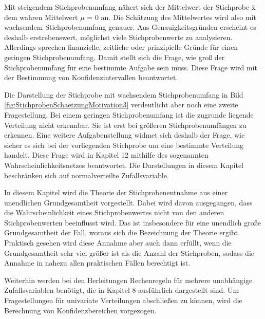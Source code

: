 \noindent Mit steigendem Stichprobenumfang n\"{a}hert sich der Mittelwert der Stichprobe $\overline{\mathrm{x}}$ dem wahren Mittelwert $\mu$ = 0 an. Die Sch\"{a}tzung des Mittelwertes wird also mit wachsendem Stichprobenumfang genauer. Aus Genauigkeitsgr\"{u}nden erscheint es deshalb erstrebenswert, m\"{o}glichst viele Stichprobenwerte zu analysieren. Allerdings sprechen finanzielle, zeitliche oder prinzipielle Gr\"{u}nde f\"{u}r einen geringen Stichprobenumfang. Damit stellt sich die Frage, wie gro{\ss} der Stichprobenumfang f\"{u}r eine bestimmte Aufgabe sein muss. Diese Frage wird mit der Bestimmung von Konfidenzintervallen beantwortet.\newline

\noindent Die Darstellung der Stichprobe mit wachsendem Stichprobenumfang in Bild \ref{fig:StichprobenSchaetzungMotivation3} verdeutlicht aber noch eine zweite Fragestellung. Bei einem geringen Stichprobenumfang ist die zugrunde liegende Verteilung nicht erkennbar. Sie ist erst bei gr\"{o}{\ss}eren Stichprobenumf\"{a}ngen zu erkennen. Eine weitere Aufgabenstellung widmet sich deshalb der Frage, wie sicher es sich bei der vorliegenden Stichprobe um eine bestimmte Verteilung handelt. Diese Frage wird in Kapitel 12 mithilfe des sogenannten Wahrscheinlichkeitsnetzes beantwortet. Die Darstellungen in diesem Kapitel beschr\"{a}nken sich auf normalverteilte Zufallsvariable.\newline

\noindent In diesem Kapitel wird die Theorie der Stichprobenentnahme aus einer unendlichen Grundgesamtheit vorgestellt. Dabei wird davon ausgegangen, dass die Wahrscheinlichkeit eines Stichprobenwertes nicht von den anderen Stichprobenwerten beeinflusst wird. Das ist insbesondere f\"{u}r eine unendlich gro{\ss}e Grundgesamtheit der Fall, woraus sich die Bezeichnung der Theorie ergibt. Praktisch gesehen wird diese Annahme aber auch dann erf\"{u}llt, wenn die Grundgesamtheit sehr viel gr\"{o}{\ss}er ist als die Anzahl der Stichproben, sodass die Annahme in nahezu allen praktischen F\"{a}llen berechtigt ist. \newline

\noindent Weiterhin werden bei den Herleitungen Rechenregeln f\"{u}r mehrere unabh\"{a}ngige Zufallsvariablen ben\"{o}tigt, die in Kapitel 8 ausf\"{u}hrlich dargestellt sind. Um Fragestellungen f\"{u}r univariate Verteilungen abschlie{\ss}en zu k\"{o}nnen, wird die Berechnung von Konfidenzbereichen vorgezogen.

\clearpage

